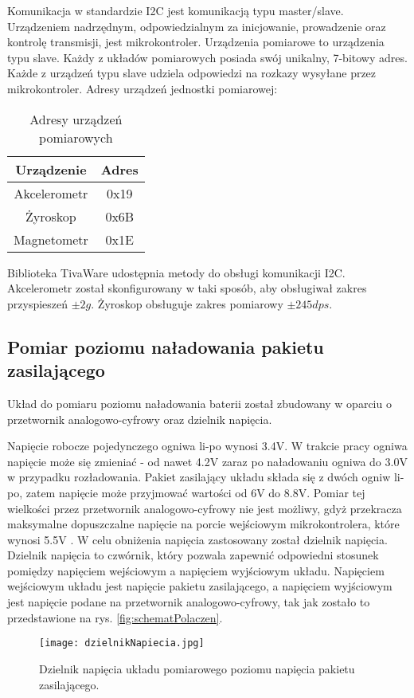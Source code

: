Komunikacja w standardzie I2C jest komunikacją typu master/slave. Urządzeniem nadrzędnym, odpowiedzialnym za inicjowanie, prowadzenie oraz kontrolę transmisji, jest mikrokontroler. Urządzenia pomiarowe to urządzenia typu slave. Każdy z układów pomiarowych posiada swój unikalny, 7-bitowy adres. Każde z urządzeń typu slave udziela odpowiedzi na rozkazy wysyłane przez mikrokontroler. Adresy urządzeń jednostki pomiarowej:

\begin{table}[h]
    \caption{Adresy urządzeń pomiarowych}
    \begin{center}
		\label{tab:adresyImu}
		\begin{tabular}{|c|c|}
			\hline
 			\textbf{Urządzenie} & \textbf{Adres} \\
 			\hline
 			Akcelerometr & 0x19 \\  
 			\hline
			Żyroskop & 0x6B \\
			\hline
			Magnetometr & 0x1E \\  
			\hline
		\end{tabular}
	\end{center}
\end{table}

Biblioteka TivaWare udostępnia metody do obsługi komunikacji I2C. Akcelerometr został skonfigurowany w taki sposób, aby obsługiwał zakres przyspieszeń $\pm2g$. Żyroskop obsługuje zakres pomiarowy $\pm245dps$.
\subsection{Pomiar poziomu naładowania pakietu zasilającego}

Układ do pomiaru poziomu naładowania baterii został zbudowany w oparciu o przetwornik analogowo-cyfrowy oraz dzielnik napięcia. 

Napięcie robocze pojedynczego ogniwa li-po wynosi 3.4V. W trakcie pracy ogniwa napięcie może się zmieniać - od nawet 4.2V zaraz po naładowaniu ogniwa do 3.0V w przypadku rozładowania. Pakiet zasilający układu składa się z dwóch ogniw li-po, zatem napięcie może przyjmować wartości od 6V do 8.8V. Pomiar tej wielkości przez przetwornik analogowo-cyfrowy nie jest możliwy, gdyż przekracza maksymalne dopuszczalne napięcie na porcie wejściowym mikrokontrolera, które wynosi 5.5V \cite{tiva}. W celu obniżenia napięcia zastosowany został dzielnik napięcia. Dzielnik napięcia to czwórnik, który pozwala zapewnić odpowiedni stosunek pomiędzy napięciem wejściowym a napięciem wyjściowym układu. Napięciem wejściowym układu jest napięcie pakietu zasilającego, a napięciem wyjściowym jest napięcie podane na przetwornik analogowo-cyfrowy, tak jak zostało to przedstawione na rys. \ref{fig:schematPolaczen}.
\begin{figure}[h]
    \centering
    \texttt{[image: dzielnikNapiecia.jpg]}
    \caption{Dzielnik napięcia układu pomiarowego poziomu napięcia pakietu zasilającego.}
    \label{fig:równia}
\end{figure}

